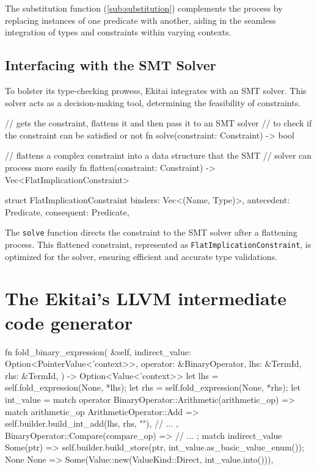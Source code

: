 \documentclass[
  oneside,
  english,
  coorientadorbanca,
  noabntexcite
]{ufsc-thesis-rn46-2019}
\begin{document}
The substitution function (\autoref{sub:substitution}) complements the process by replacing instances of one predicate with another, aiding in the seamless integration of types and constraints within varying contexts.

\subsection{Interfacing with the SMT Solver}

To bolster its type-checking prowess, Ekitai integrates with an SMT solver. This solver acts as a decision-making tool, determining the feasibility of constraints.

\begin{rustcode}
// gets the constraint, flattens it and then pass it to an SMT solver
// to check if the constraint can be satisfied or not
fn solve(constraint: Constraint) -> bool

// flattens a complex constraint into a data structure that the SMT
// solver can process more easily
fn flatten(constraint: Constraint) -> Vec<FlatImplicationConstraint>

struct FlatImplicationConstraint {
    binders: Vec<(Name, Type)>,
    antecedent: Predicate,
    consequent: Predicate,
}
\end{rustcode}

The \texttt{solve} function directs the constraint to the SMT solver after a flattening process. This flattened constraint, represented as \texttt{FlatImplicationConstraint}, is optimized for the solver, ensuring efficient and accurate type validations.

\section{The Ekitai's LLVM intermediate code generator}

\begin{rustcode}
fn fold_binary_expression(
  &self,
  indirect_value: Option<PointerValue<'context>>,
  operator: &BinaryOperator,
  lhs: &TermId,
  rhs: &TermId,
) -> Option<Value<'context>> {
  let lhs = self.fold_expression(None, *lhs);
  let rhs = self.fold_expression(None, *rhs);
  let int_value = match operator {
    BinaryOperator::Arithmetic(arithmetic_op) => match arithmetic_op {
      ArithmeticOperator::Add => self.builder.build_int_add(lhs, rhs, ""),
      // ...
    },
    BinaryOperator::Compare(compare_op) => {
      // ...
    }
  };
  match indirect_value {
    Some(ptr) => {
      self.builder.build_store(ptr, int_value.as_basic_value_enum());
      None
    }
    None => Some(Value::new(ValueKind::Direct, int_value.into())),
  }
}
\end{rustcode}
\end{document}
